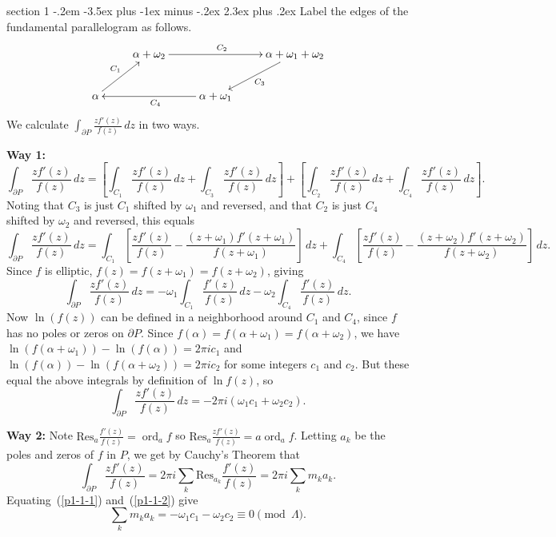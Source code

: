 \documentclass[12pt]{article}
\makeatletter
\theoremstyle{norm}
\newcommand{\al}[0]{\alpha}
\newcommand{\La}[0]{\Lambda}
\newcommand{\ba}[1]{\left[ {#1} \right]}
\newcommand{\ord}[0]{\operatorname{ord}}
\newcommand{\Res}[0]{\text{Res}}
\newenvironment{problem}{\@startsection
       {section}
       {1}
       {-.2em}
       {-3.5ex plus -1ex minus -.2ex}
       {2.3ex plus .2ex}
       {\pagebreak[3]%
       \large\bf\noindent{Problem }
       }
       }
       {%
       }
\makeatother
\begin{document}
\begin{problem}{}
Label the edges of the fundamental parallelogram as follows.
\[
\xymatrix{
& \al+\omega_2 \ar[rr]^{C_2} & & \al+\omega_1+\omega_2\ar[ld]^{C_3} \\
\al\ar[ur]^{C_1} & &\al+\omega_1 \ar[ll]^{C_4}&
}
\]
We calculate $\int_{\partial P} \frac{zf'(z)}{f(z)}\,dz$ in two ways.

\textbf{Way 1:} 
\[
\int_{\partial P} \frac{zf'(z)}{f(z)} \,dz=\ba{
\int_{C_1} \frac{zf'(z)}{f(z)}\,dz
+\int_{C_3} \frac{zf'(z)}{f(z)}\,dz
}
+\ba{
\int_{C_2} \frac{zf'(z)}{f(z)}\,dz
+\int_{C_4} \frac{zf'(z)}{f(z)}\,dz
}.
\]
Noting that $C_3$ is just $C_1$ shifted by $\omega_1$ and reversed, and that $C_2$ is just $C_4$ shifted by $\omega_2$ and reversed, this equals
\[
\int_{\partial P} \frac{zf'(z)}{f(z)} \,dz=
\int_{C_1} \ba{\frac{zf'(z)}{f(z)}
-\frac{(z+\omega_1)f'(z+\omega_1)}{f(z+\omega_1 )}
}\,dz
+
\int_{C_4} \ba{\frac{zf'(z)}{f(z)}- \frac{(z+\omega_2)f'(z+\omega_2)}{f(z+\omega_2)}
}\,dz.
\]
Since $f$ is elliptic, $f(z)=f(z+\omega_1)=f(z+\omega_2)$, giving
\[
\int_{\partial P} \frac{zf'(z)}{f(z)} \,dz=
-\omega_1\int_{C_1} \frac{f'(z)}{f(z)} \,dz-\omega_2\int_{C_4} \frac{f'(z)}{f(z)}\,dz.
\]
Now $\ln(f(z))$ can be defined in a neighborhood around $C_1$ and $C_4$, since $f$ has no poles or zeros on $\partial P$. Since $f(\al)=f(\al+\omega_1)=f(\al+\omega_2)$, we have $\ln(f(\al+\omega_1))-\ln(f(\al))=2\pi i c_1$ and $\ln(f(\al))-\ln(f(\al+\omega_2))=2\pi i c_2$ for some integers $c_1$ and $c_2$. But these equal the above integrals by definition of $\ln f(z)$, so
\begin{equation}\label{p1-1-1}
\int_{\partial P} \frac{zf'(z)}{f(z)} \,dz=
-2\pi i(\omega_1 c_1+\omega_2 c_2).
\end{equation}

\textbf{Way 2:}
Note $\Res_a \frac{f'(z)}{f(z)}=\ord_a f$ so $\Res_a \frac{zf'(z)}{f(z)}=a \ord_a f$. Letting $a_k$ be the poles and zeros of $f$ in $P$, we get by Cauchy's Theorem that
\begin{equation}\label{p1-1-2}
\int_{\partial P} \frac{zf'(z)}{f(z)}=2\pi i\sum_{k} \Res_{a_k} \frac{f'(z)}{f(z)}=2\pi i \sum_{k}m_k a_k.
\end{equation}
Equating~(\ref{p1-1-1}) and~(\ref{p1-1-2}) give
\[
\sum_{k}m_ka_k=-\omega_1c_1-\omega_2c_2\equiv 0\pmod{\La}.
\]
\end{problem}
\end{document}
